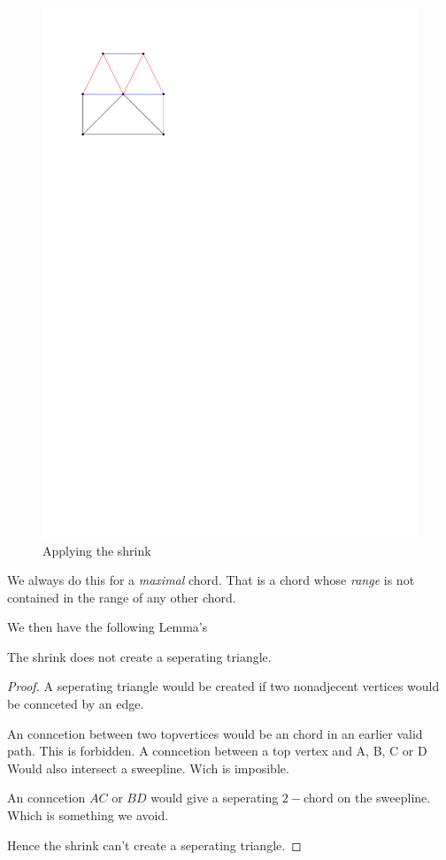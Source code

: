 \begin{figure}[h]
  \centering
  \includegraphics[scale=1]{chordShrink/img/shrink}
  \caption{Applying the shrink}
  \label{fig:chord:shrink}
\end{figure}

We always do this for a \emph{maximal} chord. That is a chord whose \emph{range} is not contained in the range of any other chord.

We then have the following Lemma's

\begin{lemma}
  \label{lm:}
  The shrink does not create a seperating triangle.
\end{lemma}

\begin{proof}
  A seperating triangle would be created if two nonadjecent vertices would be connceted by an edge.

  An conncetion between two topvertices would be an chord in an earlier valid path. This is forbidden. A conncetion between a top vertex and A, B, C or D Would also intersect a sweepline. Wich is imposible.

  An conncetion $AC$ or $BD$ would give a seperating $2-$chord on the sweepline. Which is something we avoid.

  Hence the shrink can't create a seperating triangle.
\end{proof}



